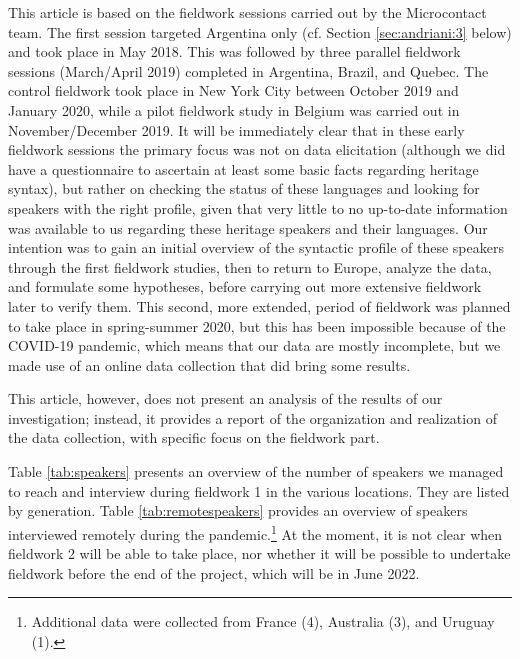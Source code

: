 \documentclass[output=paper,hidelinks]{langscibook}
\begin{document}
This article is based on the fieldwork sessions carried out by the Microcontact team. The first session targeted Argentina only (cf. Section \ref{sec:andriani:3} below) and took place in May 2018. This was followed by three parallel fieldwork sessions (March/April 2019) completed in Argentina, Brazil, and Quebec. The control fieldwork took place in New York City between October 2019 and January 2020, while a pilot fieldwork study in Belgium was carried out in November/December 2019. It will be immediately clear that in these early fieldwork sessions the primary focus was not on data elicitation (although we did have a questionnaire to ascertain at least some basic facts regarding heritage syntax), but rather on checking the status of these languages and looking for speakers with the right profile, given that very little to no up-to-date information was available to us regarding these heritage speakers and their languages. Our intention was to gain an initial overview of the syntactic profile of these speakers through the first fieldwork studies, then to return to Europe, analyze the data, and formulate some hypotheses, before carrying out more extensive fieldwork later to verify them. This second, more extended, period of fieldwork was planned to take place in spring-summer 2020, but this has been impossible because of the COVID-19 pandemic, which means that our data are mostly incomplete, but we made use of an online data collection that did bring some results.

This article, however, does not present an analysis of the results of our investigation; instead, it provides a report of the organization and realization of the data collection, with specific focus on the fieldwork part. 

Table \ref{tab:speakers} presents an overview of the number of speakers we managed to reach and interview during fieldwork 1 in the various locations. They are listed by generation. Table \ref{tab:remotespeakers} provides an overview of speakers interviewed remotely during the pandemic.\footnote{Additional data were collected from France (4), Australia (3), and Uruguay (1).} At the moment, it is not clear when fieldwork 2 will be able to take place, nor whether it will be possible to undertake fieldwork before the end of the project, which will be in June 2022. 
\end{document}
